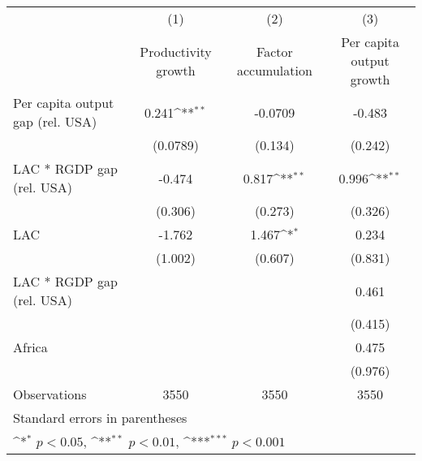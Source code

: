 {
\def\sym#1{\ifmmode^{#1}\else\(^{#1}\)\fi}
\begin{tabular}{l*{3}{c}}
\hline\hline
                    &\multicolumn{1}{c}{(1)}&\multicolumn{1}{c}{(2)}&\multicolumn{1}{c}{(3)}\\
                    &\multicolumn{1}{c}{Productivity growth}&\multicolumn{1}{c}{Factor accumulation}&\multicolumn{1}{c}{Per capita output growth}\\
\hline
Per capita output gap (rel. USA)&       0.241\sym{**} &     -0.0709         &      -0.483         \\
                    &    (0.0789)         &     (0.134)         &     (0.242)         \\
[1em]
LAC * RGDP gap (rel. USA)&      -0.474         &       0.817\sym{**} &       0.996\sym{**} \\
                    &     (0.306)         &     (0.273)         &     (0.326)         \\
[1em]
LAC                 &      -1.762         &       1.467\sym{*}  &       0.234         \\
                    &     (1.002)         &     (0.607)         &     (0.831)         \\
[1em]
LAC * RGDP gap (rel. USA)&                     &                     &       0.461         \\
                    &                     &                     &     (0.415)         \\
[1em]
Africa              &                     &                     &       0.475         \\
                    &                     &                     &     (0.976)         \\
\hline
Observations        &        3550         &        3550         &        3550         \\
\hline\hline
\multicolumn{4}{l}{\footnotesize Standard errors in parentheses}\\
\multicolumn{4}{l}{\footnotesize \sym{*} \(p<0.05\), \sym{**} \(p<0.01\), \sym{***} \(p<0.001\)}\\
\end{tabular}
}

